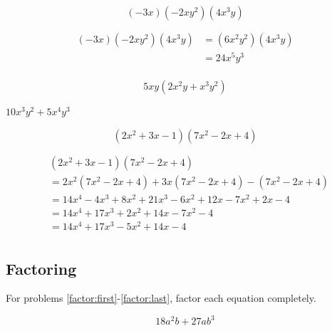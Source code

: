 \documentclass[fleqn,addpoints]{exam}
\begin{document}
\begin{questions}
\question[5]
\label{product:first}
\[ (-3x)(-2xy^2)(4x^3y) \]
\begin{solution}[3 cm]

\begin{align*}
  (-3x)(-2xy^2)(4x^3y) &= (6x^2y^2)(4x^3y) \\
  &= 24x^5y^3 \\
\end{align*}

\end{solution}

\question[5]
\[ 5xy(2x^2y + x^3y^2) \]
\begin{solution}[4 cm]

\( 10x^3y^2 + 5x^4y^3 \)

\end{solution}



\question[5]
\label{product:last}
\[ (2x^2 + 3x - 1)(7x^2 - 2x + 4) \]
\begin{solution}[4 cm]

\begin{align*}
  & (2x^2 + 3x - 1)(7x^2 - 2x + 4) \\
  &= 2x^2(7x^2 - 2x + 4) + 3x(7x^2 - 2x + 4) - (7x^2 - 2x + 4) \\
  &= 14x^4 - 4x^3 + 8x^2 + 21x^3 - 6x^2 + 12x - 7x^2 + 2x - 4 \\
  &= 14x^4 + 17x^3 + 2x^2 + 14x - 7x^2 - 4 \\
  &= 14x^4 + 17x^3 - 5x^2 + 14x - 4 \\
\end{align*}

\end{solution}

\subsection{Factoring}

For problems \ref{factor:first}-\ref{factor:last}, factor each equation completely.

\question[5]
\label{factor:first}
\[ 18a^2b + 27ab^3 \]
\begin{solution}[4 cm]


\end{solution}
\end{questions}
\end{document}
